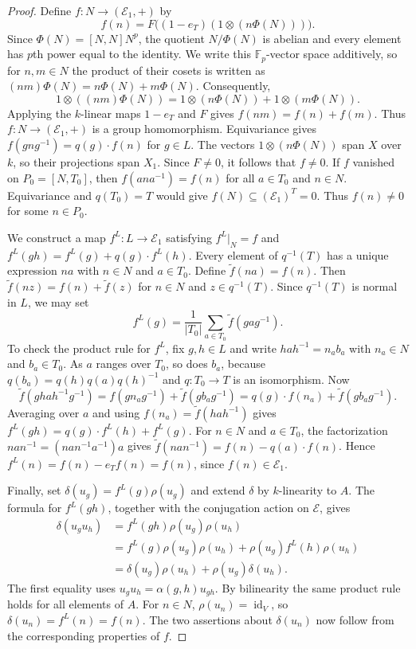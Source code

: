 \documentclass[11pt,a4paper]{article}
\theoremstyle{definition}
\theoremstyle{remark}
\numberwithin{equation}{section}
\newcommand{\Fp}{\mathbb{F}_p}
\DeclareMathOperator{\id}{id}
\begin{document}
\begin{proof}
		Define $f:N\to(\mathcal{E}_1,+)$ by
		\[
		f(n)=F\bigl((1-e_T)(1\otimes(n\Phi(N)))\bigr).
		\]
		Since $\Phi(N)=[N,N]N^p$, the quotient $N/\Phi(N)$ is abelian and
		every element has $p$th power equal to the identity. We write this
		$\Fp$-vector space additively, so for $n,m\in N$ the product of
		their cosets is written as $(nm)\Phi(N)=n\Phi(N)+m\Phi(N)$.
		Consequently,
		\[
		1\otimes((nm)\Phi(N))=1\otimes(n\Phi(N))+1\otimes(m\Phi(N)).
		\]
		Applying the $k$-linear maps $1-e_T$ and $F$ gives
		$f(nm)=f(n)+f(m)$. Thus $f:N\to(\mathcal{E}_1,+)$ is a group
		homomorphism. Equivariance gives
		$f(gng^{-1})=q(g)\cdot f(n)$ for $g\in L$. The vectors
		$1\otimes(n\Phi(N))$ span $X$ over $k$, so their projections span
		$X_1$. Since $F\ne0$, it follows that $f\ne0$. If $f$ vanished on
		$P_0=[N,T_0]$, then $f(ana^{-1})=f(n)$ for all $a\in T_0$ and $n\in N$.
		Equivariance and $q(T_0)=T$ would give $f(N)\subseteq(\mathcal{E}_1)^T=0$.
		Thus $f(n)\ne0$ for some $n\in P_0$.
		
		We construct a map $f^{L}:L\to\mathcal{E}_1$ satisfying $f^{L}|_N=f$ and
		$f^{L}(gh)=f^{L}(g)+q(g)\cdot f^{L}(h)$. Every element of $q^{-1}(T)$ has a unique
		expression $na$ with $n\in N$ and $a\in T_0$. Define
		$\widetilde f(na)=f(n)$. Then $\widetilde f(nz)=f(n)+\widetilde f(z)$
		for $n\in N$ and $z\in q^{-1}(T)$. Since $q^{-1}(T)$ is normal in $L$,
		we may set
		\[
		f^{L}(g)=\frac{1}{|T_0|}\sum_{a\in T_0}\widetilde f(gag^{-1}).
		\]
		To check the product rule for $f^{L}$, fix $g,h\in L$ and write
		$hah^{-1}=n_a b_a$ with $n_a\in N$ and $b_a\in T_0$. As $a$ ranges
		over $T_0$, so does $b_a$, because $q(b_a)=q(h)q(a)q(h)^{-1}$ and
		$q:T_0\to T$ is an isomorphism. Now
		\[
		\widetilde f(ghah^{-1}g^{-1})
		=f(gn_ag^{-1})+\widetilde f(gb_ag^{-1})
		=q(g)\cdot f(n_a)+\widetilde f(gb_ag^{-1}).
		\]
		Averaging over $a$ and using $f(n_a)=\widetilde f(hah^{-1})$ gives
		$f^{L}(gh)=q(g)\cdot f^{L}(h)+f^{L}(g)$. For $n\in N$ and $a\in T_0$, the
		factorization $nan^{-1}=(nan^{-1}a^{-1})a$ gives
		$\widetilde f(nan^{-1})=f(n)-q(a)\cdot f(n)$. Hence
		$f^{L}(n)=f(n)-e_Tf(n)=f(n)$, since $f(n)\in\mathcal{E}_1$.
		
		Finally, set $\delta(u_g)=f^{L}(g)\rho(u_g)$ and extend $\delta$ by
		$k$-linearity to $A$. The formula for $f^{L}(gh)$, together with the
		conjugation action on $\mathcal{E}$, gives
		\[
		\begin{aligned}
			\delta(u_gu_h)
			&=f^{L}(gh)\rho(u_g)\rho(u_h)\\
			&=f^{L}(g)\rho(u_g)\rho(u_h)+\rho(u_g)f^{L}(h)\rho(u_h)\\
			&=\delta(u_g)\rho(u_h)+\rho(u_g)\delta(u_h).
		\end{aligned}
		\]
		The first equality uses $u_gu_h=\alpha(g,h)u_{gh}$. By bilinearity
		the same product rule holds for all elements of $A$. For $n\in N$,
		$\rho(u_n)=\id_V$, so $\delta(u_n)=f^{L}(n)=f(n)$. The two assertions
		about $\delta(u_n)$ now follow from the corresponding properties of $f$.
	\end{proof}
	
\end{document}
